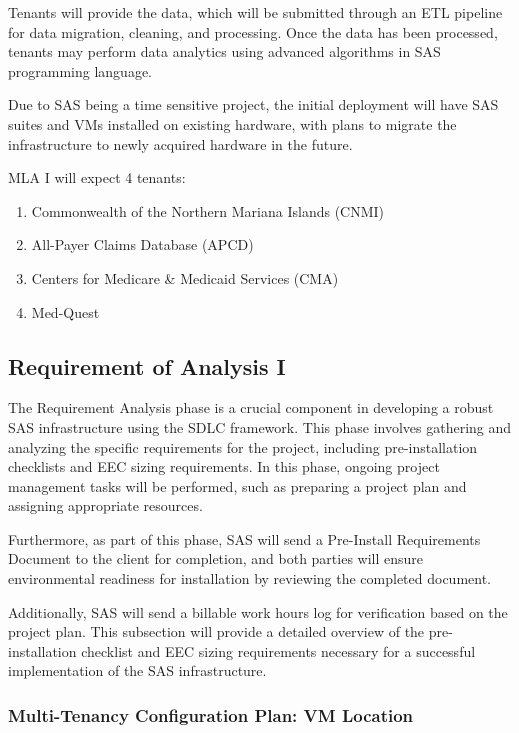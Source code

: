 Tenants will provide the data, which will be submitted through an ETL pipeline for data migration, cleaning, and processing. Once the data has been processed, tenants may perform data analytics using advanced algorithms in SAS programming language.

Due to SAS being a time sensitive project, the initial deployment will have SAS suites and VMs installed on existing hardware, with plans to migrate the infrastructure to newly acquired hardware in the future.

MLA I will expect 4 tenants:
\begin{enumerate}
    \item Commonwealth of the Northern Mariana Islands (CNMI)
    \item All-Payer Claims Database (APCD)
    \item Centers for Medicare \& Medicaid Services (CMA)
    \item Med-Quest
\end{enumerate}

\subsection{Requirement of Analysis I}

The Requirement Analysis phase is a crucial component in developing a robust SAS infrastructure using the SDLC framework. This phase involves gathering and analyzing the specific requirements for the project, including pre-installation checklists and EEC sizing requirements. In this phase, ongoing project management tasks will be performed, such as preparing a project plan and assigning appropriate resources. 

Furthermore, as part of this phase, SAS will send a Pre-Install Requirements Document to the client for completion, and both parties will ensure environmental readiness for installation by reviewing the completed document. 

Additionally, SAS will send a billable work hours log for verification based on the project plan. This subsection will provide a detailed overview of the pre-installation checklist and EEC sizing requirements necessary for a successful implementation of the SAS infrastructure.

\newpage 

\subsubsection{Multi-Tenancy Configuration Plan: VM Location}
\label{Multi-Tenancy Configuration Plan}

